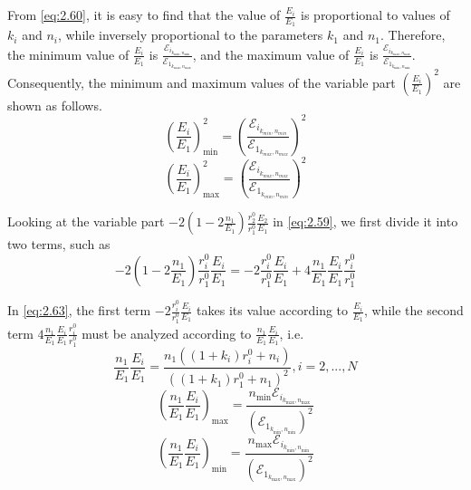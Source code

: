 \documentclass[journal]{IEEEtran}
\begin{document}
From \eqref{eq:2.60}, it is easy to find that the value of ${\frac{E_i}{E_1}}$ is proportional to values of ${k_i}$ and ${n_i}$, while inversely proportional to the parameters ${k_1}$ and ${n_1}$. Therefore, the minimum value of ${\frac{E_i}{E_1}}$ is $\frac{\mathcal{E}_{i_{{k_{\min}},{n_{\min}}}}}{\mathcal{E}_{1_{{k_{\max}},{n_{\max}}}}}$, and the maximum value of ${\frac{E_i}{E_1}}$ is $\frac{\mathcal{E}_{i_{{k_{\max}},{n_{\max}}}}}{\mathcal{E}_{1_{{k_{\min}},{n_{\min}}}}}$. Consequently, the minimum and maximum values of the variable part $\left({\frac{E_i}{E_1}}\right)^2$ are shown as follows.
\begin{equation}\label{eq:2.61}
   \left(\frac{E_i}{E_1}\right)^2_{\min}={\left(\frac{\mathcal{E}_{i_{{k_{min}},{n_{min}}}}}{\mathcal{E}_{1_{{k_{max}},{n_{max}}}}}\right)^2}
\end{equation}
\begin{equation}\label{eq:2.62}
   \left(\frac{E_i}{E_1}\right)^2_{\max}={\left(\frac{\mathcal{E}_{i_{{k_{max}},{n_{max}}}}}{\mathcal{E}_{1_{{k_{min}},{n_{min}}}}}\right)^2}
\end{equation}

Looking at the variable part $-2 \left(1-2{\frac{n_1}{E_1}}\right){\frac{{{r}_{2}^{0}}}{{{r}_{1}^{0}}}}{\frac{E_2}{E_1}}$ in \eqref{eq:2.59}, we first divide it into two terms, such as
\begin{equation}\label{eq:2.63}
-2\left(1-2{\frac{n_1}{E_1}}\right){\frac{{{r}_{i}^{0}}}{{{r}_{1}^{0}}}}{\frac{E_i}{E_1}}
= -2{\frac{{{r}_{i}^{0}}}{{{r}_{1}^{0}}}}{\frac{E_i}{E_1}} + 4{\frac{n_1}{E_1}}{\frac{E_i}{E_1}}{\frac{{{r}_{i}^{0}}}{{{r}_{1}^{0}}}}
\end{equation}

In \eqref{eq:2.63}, the first term  $-2{\frac{{{{r}_{i}^{0}}}}{{{r}_{1}^{0}}}}{\frac{E_i}{E_1}}$ takes its value according to ${\frac{E_i}{E_1}}$, while the second term $4{\frac{n_1}{E_1}}{\frac{E_i}{E_1}}{\frac{{{r}_{i}^{0}}}{{{r}_{1}^{0}}}}$ must be analyzed according to ${\frac{n_1}{E_1}}{\frac{E_i}{E_1}}$, i.e.
\begin{equation}\label{eq:2.64}
{\frac{n_1}{E_1}}{\frac{E_i}{E_1}} =
\frac{{n_1}\left(\left(1+{k_i}\right){{r}_{i}^{0}}+{n_i}\right)}{\left(\left(1+{k_1}\right){{r}_{1}^{0}}+{n_1}\right)^2},i=2,...,N
\end{equation}
\begin{equation}\label{eq:2.65}
   \left({\frac{n_1}{E_1}}{\frac{E_i}{E_1}}\right)_{\max} = {\frac{{n_{\min}}\mathcal{E}_{i_{{k_{\max}},{n_{\max}}}}}{\left(\mathcal{E}_{1_{{k_{\min}},{n_{\min}}}}\right)^2}} 
\end{equation}
\begin{equation}\label{eq:2.66}
   \left({\frac{n_1}{E_1}}{\frac{E_i}{E_1}}\right)_{\min} = {\frac{{n_{\max}}\mathcal{E}_{i_{{k_{\min}},{n_{\min}}}}}{\left(\mathcal{E}_{1_{{k_{\max}},{n_{\max}}}}\right)^2}}
\end{equation}
\end{document}
